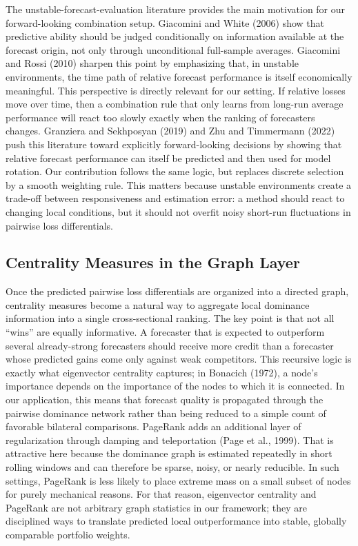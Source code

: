 \documentclass[11pt,a4paper]{article}
\begin{document}
The unstable-forecast-evaluation literature provides the main motivation for our forward-looking combination setup. Giacomini and White (2006) show that predictive ability should be judged conditionally on information available at the forecast origin, not only through unconditional full-sample averages. Giacomini and Rossi (2010) sharpen this point by emphasizing that, in unstable environments, the time path of relative forecast performance is itself economically meaningful. This perspective is directly relevant for our setting. If relative losses move over time, then a combination rule that only learns from long-run average performance will react too slowly exactly when the ranking of forecasters changes. Granziera and Sekhposyan (2019) and Zhu and Timmermann (2022) push this literature toward explicitly forward-looking decisions by showing that relative forecast performance can itself be predicted and then used for model rotation. Our contribution follows the same logic, but replaces discrete selection by a smooth weighting rule. This matters because unstable environments create a trade-off between responsiveness and estimation error: a method should react to changing local conditions, but it should not overfit noisy short-run fluctuations in pairwise loss differentials.

\subsection{Centrality Measures in the Graph Layer}

Once the predicted pairwise loss differentials are organized into a directed graph, centrality measures become a natural way to aggregate local dominance information into a single cross-sectional ranking. The key point is that not all ``wins'' are equally informative. A forecaster that is expected to outperform several already-strong forecasters should receive more credit than a forecaster whose predicted gains come only against weak competitors. This recursive logic is exactly what eigenvector centrality captures; in Bonacich (1972), a node's importance depends on the importance of the nodes to which it is connected. In our application, this means that forecast quality is propagated through the pairwise dominance network rather than being reduced to a simple count of favorable bilateral comparisons. PageRank adds an additional layer of regularization through damping and teleportation (Page et al., 1999). That is attractive here because the dominance graph is estimated repeatedly in short rolling windows and can therefore be sparse, noisy, or nearly reducible. In such settings, PageRank is less likely to place extreme mass on a small subset of nodes for purely mechanical reasons. For that reason, eigenvector centrality and PageRank are not arbitrary graph statistics in our framework; they are disciplined ways to translate predicted local outperformance into stable, globally comparable portfolio weights.
\end{document}
